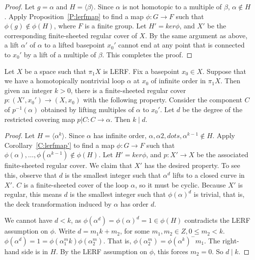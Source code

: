 \begin{proof}

Let $g = \alpha$ and $H = \langle\beta\rangle$. Since $\alpha$ is not homotopic
to a multiple of $\beta$, $\alpha \notin H$. Apply Proposition~\ref{P:lerfmap}
to find a map $\phi \colon G \to F$ such that $\phi(g) \notin \phi(H)$, where
$F$ is a finite group.  Let $H' = ker \phi$, and $X'$ be the corresponding
finite-sheeted regular cover of $X$. By the same argument as above, a lift
$\alpha'$ of $\alpha$ to a lifted basepoint $x_0'$ cannot end at any point that
is connected to $x_0'$ by a lift of a multiple of $\beta$. This completes the
proof.

\end{proof}

\begin{prop}\label{P:lerf3}

Let $X$ be a space such that $\pi_1X$ is LERF. Fix a basepoint $x_0 \in X$.
Suppose that we have a homotopically nontrivial loop $\alpha$ at $x_0$ of
infinite order in $\pi_1X$.  Then given an integer $k>0$, there is
a finite-sheeted regular cover $p \colon (X',x_0') \to (X,x_0)$ with the
following property.  Consider the component $C$ of $p^{-1}(\alpha)$ obtained by
lifting multiples of $\alpha$ to $x_0'$. Let $d$ be the degree of the
restricted covering map $p|C \colon C \to \alpha$. Then $k \mid d$.

\end{prop}

\begin{proof}

Let $H = \langle\alpha^k\rangle$. Since $\alpha$ has infinite order,
$\alpha,\alpha2,dots,\alpha^{k-1} \notin H$. Apply Corollary~\ref{C:lerfmap'}
to find a map $\phi \colon G \to F$ such that
$\phi(\alpha),\dots,\phi(\alpha^{k-1}) \notin \phi(H)$. Let $H' = ker \phi$,
and $p \colon X' \to X$ be the associated finite-sheeted regular cover.  We
claim that $X'$ has the desired property. To see this, observe that $d$ is the
smallest integer such that $\alpha^d$ lifts to a closed curve in $X'$. $C$ is
a finite-sheeted cover of the loop $\alpha$, so it must be cyclic. Because $X'$
is regular, this means $d$ is the smallest integer such that $\phi(\alpha)^d$
is trivial, that is, the deck transformation induced by $\alpha$ has order $d$.

We cannot have $d<k$, as $\phi(\alpha^d)=\phi(\alpha)^d=1 \in \phi(H)$
contradicts the LERF assumption on $\phi$. Write $d = m_1k + m_2$, for some
$m_1,m_2 \in Z, 0 \leq m_2 < k$.
$\phi(\alpha^d)=1=\phi(\alpha^m_1k)\phi(\alpha^m_2)$.  That is,
$\phi(\alpha^m_2)=\phi(\alpha^k)^-m_1$. The right-hand side is in $H$. By the
LERF assumption on $\phi$, this forces $m_2=0$. So $d \mid k$.

\end{proof}

